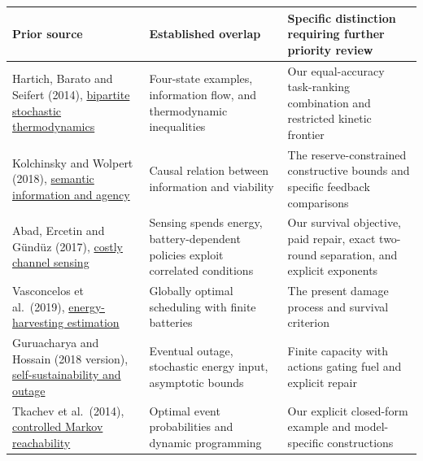 \documentclass[
  11pt,
]{article}
\newcounter{none} %
\begin{document}
{\def\LTcaptype{none} %
\begin{longtable}[]{@{}
  >{\raggedright\arraybackslash}p{}
  >{\raggedright\arraybackslash}p{}
  >{\raggedright\arraybackslash}p{}@{}}
\toprule\noalign{}
\begin{minipage}[b]{\linewidth}\raggedright
Prior source
\end{minipage} & \begin{minipage}[b]{\linewidth}\raggedright
Established overlap
\end{minipage} & \begin{minipage}[b]{\linewidth}\raggedright
Specific distinction requiring further priority review
\end{minipage} \\
\midrule\noalign{}
\endhead
\bottomrule\noalign{}
\endlastfoot
Hartich, Barato and Seifert (2014),
\href{https://arxiv.org/abs/1402.0419}{bipartite stochastic
thermodynamics} & Four-state examples, information flow, and
thermodynamic inequalities & Our equal-accuracy task-ranking combination
and restricted kinetic frontier \\
Kolchinsky and Wolpert (2018),
\href{https://arxiv.org/abs/1806.08053}{semantic information and agency}
& Causal relation between information and viability & The
reserve-constrained constructive bounds and specific feedback
comparisons \\
Abad, Ercetin and Gündüz (2017),
\href{https://arxiv.org/html/1703.10519v2}{costly channel sensing} &
Sensing spends energy, battery-dependent policies exploit correlated
conditions & Our survival objective, paid repair, exact two-round
separation, and explicit exponents \\
Vasconcelos et al.~(2019),
\href{https://arxiv.org/abs/1908.06070}{energy-harvesting estimation} &
Globally optimal scheduling with finite batteries & The present damage
process and survival criterion \\
Guruacharya and Hossain (2018 version),
\href{https://arxiv.org/abs/1702.01648}{self-sustainability and outage}
& Eventual outage, stochastic energy input, asymptotic bounds & Finite
capacity with actions gating fuel and explicit repair \\
Tkachev et al.~(2014),
\href{https://arxiv.org/html/1407.5449v1}{controlled Markov
reachability} & Optimal event probabilities and dynamic programming &
Our explicit closed-form example and model-specific constructions \\

\end{longtable}}
\end{document}
